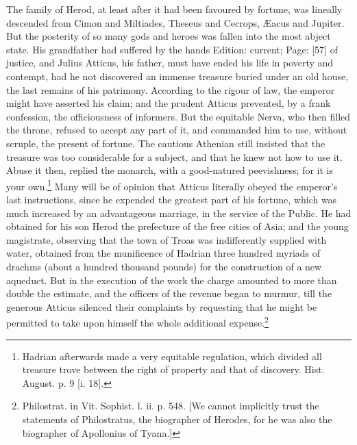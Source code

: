 The family of Herod, at least after it had been favoured by fortune, was lineally descended from Cimon and Miltiades, Theseus and Cecrops, Æacus and Jupiter. But the posterity of so many gods and heroes was fallen into the most abject state. His grandfather had suffered by the hands Edition: current; Page: [57] of justice, and Julius Atticus, his father, must have ended his life in poverty and contempt, had he not discovered an immense treasure buried under an old house, the last remains of his patrimony. According to the rigour of law, the emperor might have asserted his claim; and the prudent Atticus prevented, by a frank confession, the officiousness of informers. But the equitable Nerva, who then filled the throne, refused to accept any part of it, and commanded him to use, without scruple, the present of fortune. The cautious Athenian still insisted that the treasure was too considerable for a subject, and that he knew not how to use it. Abuse it then, replied the monarch, with a good-natured peevishness; for it is your own.\footnote{Hadrian afterwards made a very equitable regulation, which divided all treasure trove between the right of property and that of discovery. Hist. August. p. 9 [i. 18].} Many will be of opinion that Atticus literally obeyed the emperor\texthebrew{}’s last instructions, since he expended the greatest part of his fortune, which was much increased by an advantageous marriage, in the service of the Public. He had obtained for his son Herod the prefecture of the free cities of Asia; and the young magistrate, observing that the town of Troas was indifferently supplied with water, obtained from the munificence of Hadrian three hundred myriads of drachms (about a hundred thousand pounds) for the construction of a new aqueduct. But in the execution of the work the charge amounted to more than double the estimate, and the officers of the revenue began to murmur, till the generous Atticus silenced their complaints by requesting that he might be permitted to take upon himself the whole additional expense.\footnote{Philostrat. in Vit. Sophist. l. ii. p. 548. [We cannot implicitly trust the statements of Philostratus, the biographer of Herodes, for he was also the biographer of Apollonius of Tyana.]}

